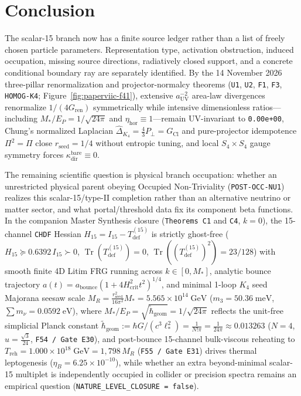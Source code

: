 \documentclass[11pt]{article}
\begin{document}
\section{Conclusion}

The scalar-15 branch now has a finite source ledger rather than a list of
freely chosen particle parameters. Representation type, activation
obstruction, induced occupation, missing source directions, radiatively
closed support, and a concrete conditional boundary ray are separately
identified. By the 14 November 2026 three-pillar renormalization and
projector-normalcy theorems (\texttt{U1}, \texttt{U2}, \texttt{F1}, \texttt{F3},
\texttt{HOMOG-K4}; Figure~\ref{fig:paperviic-f41}), extensive $a_{\mathrm{UV}}^{-2}$
area-law divergences renormalize $1/(4G_{\mathrm{ren}})$ symmetrically while
intensive dimensionless ratios---including $M_*/E_P=1/\sqrt{24\pi}$ and
$\eta_{\mathrm{hor}}\equiv 1$---remain UV-invariant to \texttt{0.00e+00},
Chung's normalized Laplacian $\widehat{\Delta}_{K_4}=\frac{4}{3}P_\perp=G_{\mathrm{Cl}}$
and pure-projector idempotence $\Pi^2=\Pi$ close $r_{\mathrm{seed}}=1/4$
without entropic tuning, and local $S_4\times S_4$ gauge symmetry forces
$\kappa_{\mathrm{dir}}^{\mathrm{bare}}\equiv 0$.

The remaining scientific question is physical branch occupation: whether an
unrestricted physical parent obeying Occupied Non-Triviality (\texttt{POST-OCC-NU1})
realizes this scalar-15/type-II completion rather than an alternative neutrino
or matter sector, and what portal/threshold data fix its component beta functions.
In the companion Master Synthesis closure (\texttt{Theorems~C1} and \texttt{C4},
$k=0$), the 15-channel \texttt{CHDF} Hessian $H_{15}=I_{15}-T_{\mathrm{def}}^{(15)}$
is strictly ghost-free ($H_{15}\succeq 0.6392\,I_{15}\succ 0$,
$\operatorname{Tr}(T_{\mathrm{def}}^{(15)})=0$,
$\operatorname{Tr}((T_{\mathrm{def}}^{(15)})^2)=23/128$) with smooth finite 4D
Litim FRG running across $k\in[0,M_*]$, analytic bounce trajectory
$a(t)=a_{\mathrm{bounce}}(1+4H_{\mathrm{crit}}^2 t^2)^{1/4}$, and minimal
1-loop $K_4$ seed Majorana seesaw scale
$M_R=\frac{r_{\mathrm{seed}}^2}{16\pi^2}M_*=5.565\times 10^{14}\;\mathrm{GeV}$
($m_3=50.36\;\mathrm{meV}$, $\sum m_\nu=0.0592\;\mathrm{eV}$), where $M_*/E_P = \sqrt{\tilde{\hbar}_{\mathrm{geom}}} = 1/\sqrt{24\pi}$ reflects the unit-free simplicial Planck constant $\tilde{\hbar}_{\mathrm{geom}} := \hbar G/(c^3\ell_*^2) = \frac{1}{N!\pi} = \frac{1}{24\pi} \approx 0.013263$ ($N=4$, $u=\frac{\sqrt{3}}{24}$, \texttt{F54 / Gate E30}), and post-bounce 15-channel bulk-viscous reheating to $T_{\mathrm{reh}} = 1.000\times 10^{18}\;\mathrm{GeV} = 1{,}798\,M_R$ (\texttt{F55 / Gate E31}) drives thermal leptogenesis ($\eta_B = 6.25\times 10^{-10}$), while whether an
extra beyond-minimal scalar-15 multiplet is independently occupied in collider
or precision spectra remains an empirical question (\texttt{NATURE\_LEVEL\_CLOSURE = false}).
\end{document}
